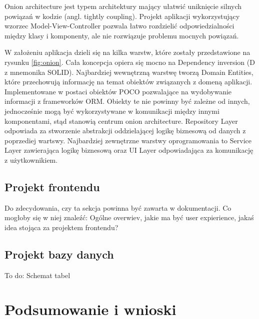 \documentclass{article}
\begin{document}
Onion architecture jest typem architektury mający ułatwić uniknięcie silnych powiązań w kodzie (angl. tightly coupling). Projekt aplikacji wykorzystujący wzorzec Model-View-Controller pozwala łatwo rozdzielić odpowiedzialności między klasy i komponenty, ale nie rozwiązuje problemu mocnych powiązań.

W założeniu aplikacja dzieli się na kilka warstw, które zostały przedstawione na rysunku \ref{fig:onion}. Cała koncepcja opiera się mocno na Dependency inversion (D z mnemonika SOLID). Najbardziej wewnętrzną warstwę tworzą Domain Entities, które przechowują informację na temat obiektów związanych z domeną aplikacji. Implementowane w postaci obiektów POCO  pozwalające na wydobywanie informacji z frameworków ORM. Obiekty te nie powinny być zależne od innych, jednocześnie mogą być wykorzystywane w komunikacji między innymi komponentami, stąd stanowią centrum onion architecture. Repository Layer odpowiada za stworzenie abstrakcji oddzielającej logikę biznesową od danych z poprzediej wartswy. Najbardziej zewnętrzne warstwy oprogramowania to Service Layer zawierająca logikę biznesową oraz UI Layer odpowiadająca za komunikację z użytkownikiem.


\subsection{Projekt frontendu}
Do zdecydowania, czy ta sekcja powinna być zawarta w dokumentacji.
Co mogłoby się w niej znaleźć:
Ogólne overwiev, jakie ma być user expierience, jakaś idea stojąca za projektem frontendu?

\subsection{Projekt bazy danych}
To do:
Schemat tabel

\section{Podsumowanie i wnioski}
\end{document}
